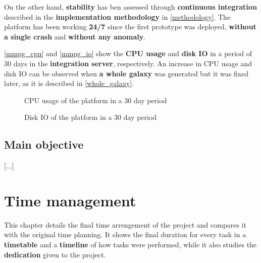 \documentclass[a4paper,11pt,titlepage,abstract,numbers=noenddot,automark,mnsy,intlimits,rgb,dvipsnames]{report}
\begin{document}
On the other hand, \textbf{stability} has ben assessed through \textbf{continuous integration} described in the \textbf{implementation
methodology} in \autoref{methodology}. The platform has been working \textbf{24/7} since the first prototype was deployed, \textbf{without
a single crash} and \textbf{without any anomaly}.

\autoref{mmpg_cpu} and \autoref{mmpg_io} show the \textbf{CPU usage} and \textbf{disk IO} in a period of 30 days in
the \textbf{integration server}, respectively. An increase in CPU usage and disk IO
can be observed when \textbf{a whole galaxy} was generated but it was fixed later, as it is described in \autoref{whole_galaxy}.
\begin{figure}[H]
\noindent{}
\caption{CPU usage of the platform in a 30 day period}
\label{mmpg_cpu}
\end{figure}
\begin{figure}[H]
\noindent{}
\caption{Disk IO of the platform in a 30 day period}
\label{mmpg_io}
\end{figure}
\section{Main objective}
[...]
\chapter{Time management}
This chapter details the final time arrengement of the project and compares it with the original time planning.
It shows the final duration for every task in a \textbf{timetable} and a \textbf{timeline} of how tasks were performed, while it
also studies the \textbf{dedication} given to the project.
\end{document}
